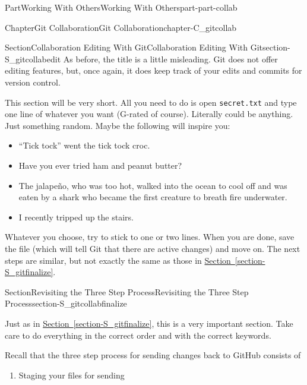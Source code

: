 \documentclass[oneside,10pt,]{book}
\newcommand{\xreffont}{\relax}
\newcommand{\mono}[1]{\texttt{#1}}
\begin{document}
\begin{partptx}{Part}{Working With Others}{}{Working With Others}{}{}{part-part-collab}
\begin{chapterptx}{Chapter}{Git Collaboration}{}{Git Collaboration}{}{}{chapter-C_gitcollab}
\typeout{************************************************}
%
\begin{sectionptx}{Section}{Collaboration Editing With Git}{}{Collaboration Editing With Git}{}{}{section-S_gitcollabedit}
%
%
As before, the title is a little misleading. Git does not offer editing features, but, once again, it does keep track of your edits and commits for version control.%
\par
This section will be very short. All you need to do is open \mono{secret.txt} and type one line of whatever you want (G-rated of course). Literally could be anything. Just something random. Maybe the following will inspire you:%
\begin{itemize}[label=\textbullet]
\item{}``Tick tock'' went the tick tock croc.%
\item{}Have you ever tried ham and peanut butter?%
\item{}The jalapeño, who was too hot, walked into the ocean to cool off and was eaten by a shark who became the first creature to breath fire underwater.%
\item{}I recently tripped up the stairs.%
\end{itemize}
%
\par
Whatever you choose, try to stick to one or two lines. When you are done, save the file (which will tell Git that there are active changes) and move on. The next steps are similar, but not exactly the same as those in \hyperref[section-S_gitfinalize]{Section~{\xreffont\ref{section-S_gitfinalize}}}.%
\end{sectionptx}
%
%
\typeout{************************************************}
\typeout{************************************************}
%
\begin{sectionptx}{Section}{Revisiting the Three Step Process}{}{Revisiting the Three Step Process}{}{}{section-S_gitcollabfinalize}
%
%
\begin{introduction}{}%
Just as in \hyperref[section-S_gitfinalize]{Section~{\xreffont\ref{section-S_gitfinalize}}}, this is a very important section. Take care to do everything in the correct order and with the correct keywords.%
\par
Recall that the three step process for sending changes back to GitHub consists of%
\begin{enumerate}
\item{}Staging your files for sending%

\end{enumerate}
\end{introduction}
\end{sectionptx}
\end{chapterptx}
\end{partptx}
\end{document}
